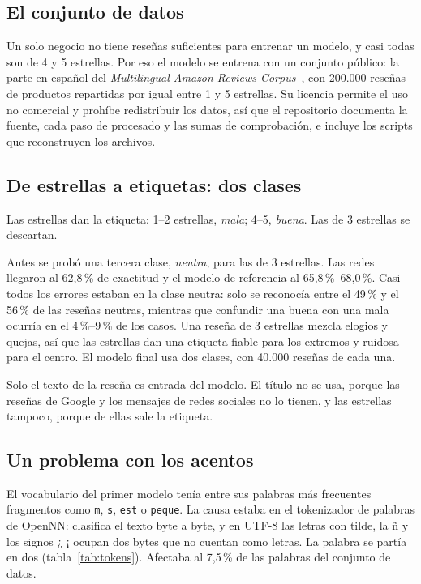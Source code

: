 \documentclass[11pt,a4paper]{article}
\newcommand{\pct}[1]{#1\,\%}
\newcommand{\code}[1]{\texttt{\small #1}}
\begin{document}
\subsection{El conjunto de datos}

Un solo negocio no tiene reseñas suficientes para entrenar un modelo, y casi todas son de 4 y 5 estrellas. Por eso el
modelo se entrena con un conjunto público: la parte en español del \emph{Multilingual Amazon Reviews
Corpus}~\cite{keung2020}, con 200.000 reseñas de productos repartidas por igual entre 1 y 5 estrellas. Su licencia
permite el uso no comercial y prohíbe redistribuir los datos, así que el repositorio documenta la fuente, cada paso
de procesado y las sumas de comprobación, e incluye los scripts que reconstruyen los archivos.

\subsection{De estrellas a etiquetas: dos clases}

Las estrellas dan la etiqueta: 1--2 estrellas, \emph{mala}; 4--5, \emph{buena}. Las de 3 estrellas se descartan.

Antes se probó una tercera clase, \emph{neutra}, para las de 3 estrellas. Las redes llegaron al \pct{62,8} de
exactitud y el modelo de referencia al \pct{65,8}--\pct{68,0}. Casi todos los errores estaban en la clase neutra:
solo se reconocía entre el \pct{49} y el \pct{56} de las reseñas neutras, mientras que confundir una buena con una
mala ocurría en el \pct{4}--\pct{9} de los casos. Una reseña de 3 estrellas mezcla elogios y quejas, así que las
estrellas dan una etiqueta fiable para los extremos y ruidosa para el centro. El modelo final usa dos clases, con
40.000 reseñas de cada una.

Solo el texto de la reseña es entrada del modelo. El título no se usa, porque las reseñas de Google y los mensajes
de redes sociales no lo tienen, y las estrellas tampoco, porque de ellas sale la etiqueta.

\subsection{Un problema con los acentos}

El vocabulario del primer modelo tenía entre sus palabras más frecuentes fragmentos como \code{m}, \code{s},
\code{est} o \code{peque}. La causa estaba en el tokenizador de palabras de OpenNN: clasifica el texto byte a byte,
y en UTF-8 las letras con tilde, la ñ y los signos ¿ ¡ ocupan dos bytes que no cuentan como letras. La palabra se
partía en dos (tabla~\ref{tab:tokens}). Afectaba al \pct{7,5} de las palabras del conjunto de datos.
\end{document}

